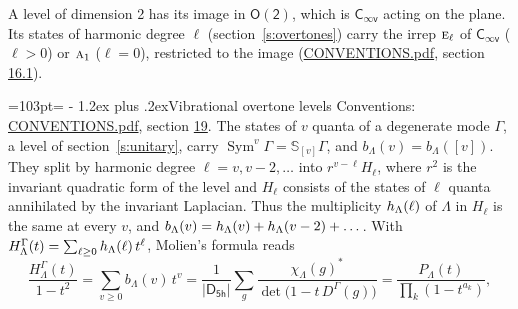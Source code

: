 \documentclass[10pt,a4paper]{article}
\makeatletter
\renewcommand\section{\@startsection{section}{1}{\z@}{-3ex plus -1ex minus -.2ex}%
  {1.2ex plus .2ex}{\normalfont\large\sffamily\bfseries\color{parttitle}}}
\newcommand{\needspace}[1]{\par\penalty-100\begingroup\dimen0=#1\relax\dimen2=\pagegoal
  \advance\dimen2-\pagetotal\ifdim\dimen0>\dimen2\relax\ifdim\dimen2>0pt\vfil\break\fi\fi
  \endgroup}
\numberwithin{equation}{section}
\newcommand{\grp}[1]{\mathsf{#1}}
\newcommand{\irr}[1]{\text{\normalfont\scshape #1}}
\newcommand{\repD}[1]{D^{#1}}
\newcommand{\irchar}[1]{\chi_{#1}}
\newcommand{\conj}[1]{{#1}^{*}}
\newcommand{\schur}[1]{\mathbb{S}_{#1}}
\newcommand{\shape}[1]{[#1]}
\makeatother
\begin{document}
A level of dimension 2 has its image in $\grp{O(2)}$, which is \href{Cinfv.pdf}{$\grp{C_{\infty v}}$} acting on the plane. \label{n:index.harmonic.degree}Its states of harmonic degree $\ell$ (section~\ref{s:overtones}) carry the irrep $\irr{e}_{\ell}$ of \href{Cinfv.pdf}{$\grp{C_{\infty v}}$} ($\ell > 0$) or $\irr{a}_{1}$ ($\ell = 0$), restricted to the image (\href{../../CONVENTIONS.pdf}{CONVENTIONS.pdf}, section \href{../../CONVENTIONS.pdf\#conv.16.1}{16.1}).
\needspace{103pt}
\section{Vibrational overtone levels}\label{s:overtones}
Conventions: \href{../../CONVENTIONS.pdf}{CONVENTIONS.pdf}, section \href{../../CONVENTIONS.pdf\#conv.19}{19}.
\leavevmode\label{n:index.quanta}\label{n:operator.symmetric.power}The states of $v$ quanta of a degenerate mode $\Gamma$, a level of section~\ref{s:unitary}, carry $\operatorname{Sym}^{v}\Gamma = \schur{\shape{v}}\Gamma$, and $b_\Lambda(v) = b_\Lambda(\shape{v})$. \label{n:local.quadratic.form}\label{n:set.harmonic}They split by harmonic degree $\ell = v, v - 2, \dots$ into $r^{v-\ell}H_\ell$, where $r^2$ is the invariant quadratic form of the level and $H_\ell$ consists of the states of $\ell$ quanta annihilated by the invariant Laplacian. \label{n:function.multiplicity.harmonic}Thus the multiplicity $\mathnormal{h}_\Lambda(\ell)$ of $\Lambda$ in $H_\ell$ is the same at every $v$, and $b_\Lambda(v) = \mathnormal{h}_\Lambda(v) + \mathnormal{h}_\Lambda(v - 2) + \dots$. \label{n:function.generating.level}With $H^{\Gamma}_\Lambda(t) = \sum_{\ell\ge0} \mathnormal{h}_\Lambda(\ell)\,t^{\ell}$, Molien's formula reads
\begin{equation}\label{e:molien}\frac{H^{\Gamma}_\Lambda(t)}{1 - t^2} = \sum_{v\ge0} b_\Lambda(v)\,t^v = \frac{1}{|\grp{D_{5h}}|}\sum_{g}\frac{\conj{\irchar{\Lambda}(g)}}{\det\bigl(1 - t\,\repD{\Gamma}(g)\bigr)} = \frac{P_\Lambda(t)}{\prod_k (1-t^{a_k})},\end{equation}
\end{document}
